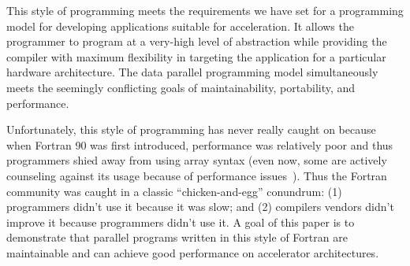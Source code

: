 

This style of programming meets the requirements we have set for a programming
model for developing applications suitable for acceleration.  It allows the programmer to
program at a very-high level of abstraction while providing the compiler with
maximum flexibility in targeting the application for a particular hardware
architecture.  The data parallel programming model simultaneously meets the
seemingly conflicting goals of maintainability, portability, and performance.

Unfortunately, this style of programming has never really caught on because
when Fortran 90 was first introduced, performance was relatively poor and thus
programmers shied away from using array syntax (even now, some are actively
counseling against its usage because of performance issues~\cite{Levesque:SC08}).
Thus the Fortran community was caught in a classic ``chicken-and-egg''
conundrum: (1) programmers didn't use it because it was slow; and (2)
compilers vendors didn't improve it because programmers didn't use it.
A goal of this paper is to demonstrate that parallel programs written in
this style of Fortran are maintainable and can achieve good performance on
accelerator architectures.

